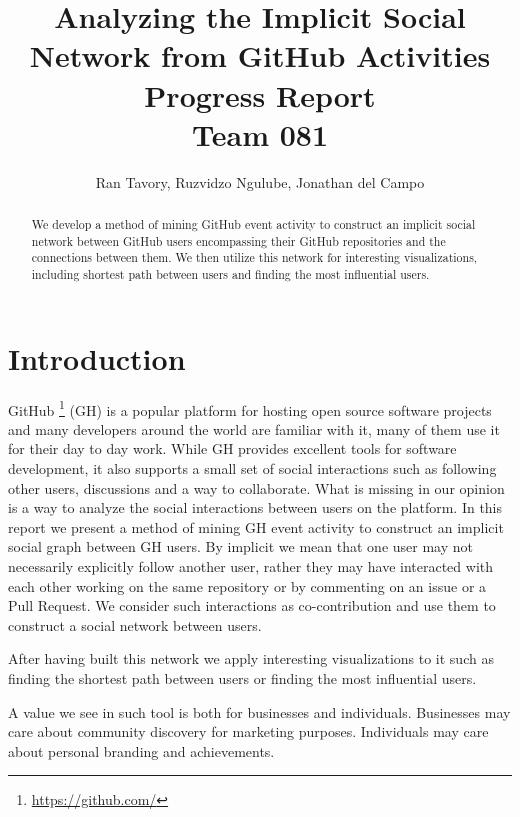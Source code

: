 \documentclass[sigconf,11pt]{acmart}
\begin{document}
\title{\Large Analyzing the Implicit Social Network from GitHub Activities \\
       \Small Progress Report \\
       \Small Team 081}

\author{\normalsize Ran Tavory, Ruzvidzo Ngulube, Jonathan del Campo}

\begin{abstract}
  We develop a method of mining GitHub event activity to construct an implicit social network
  between GitHub users encompassing their GitHub repositories and the connections between them.
  We then utilize this network for interesting visualizations, including shortest path between users
  and finding the most influential users.
\end{abstract}

\maketitle
\pagestyle{plain}


\section*{Introduction}
GitHub \footnote{\url{https://github.com/}} (GH) is a popular platform for hosting open source software
projects and many developers around the world are familiar with it, many of them use it for their day to day work.
While GH provides  excellent tools for software development, it also supports a small set of social interactions such
as following other users, discussions and a way to collaborate.
What is missing in our opinion is a way to analyze the social interactions between users on the platform.
In this report we present a method of mining GH event activity to construct an implicit social graph between GH users.
By implicit we mean that one user may not necessarily explicitly follow another user, rather they may have interacted with each other
working on the same repository or by commenting on an issue or a Pull Request.
We consider such interactions as co-contribution and use them to construct a social network between users.

After having built this network we apply interesting visualizations to it such as finding the shortest path between users
or finding the most influential users.

A value we see in such tool is both for businesses and individuals.
Businesses may care about community discovery for marketing purposes.
Individuals may care about personal branding and achievements.
\end{document}
